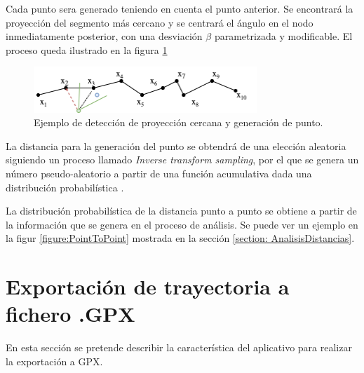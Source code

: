 Cada punto sera generado teniendo en cuenta el punto anterior. Se encontrará la proyección del segmento
más cercano y se centrará el ángulo en el nodo inmediatamente posterior, con una desviación $\beta$ 
parametrizada y modificable. El proceso queda ilustrado en la figura \ref{fig:PointGeneration02}

\begin{figure}[htb]
\begin{center}
\includegraphics[width=0.75\textwidth]{./Imagenes/PointGeneration02.png}
\caption{Ejemplo de detección de proyección cercana y generación de punto.}
\label{fig:PointGeneration02}
\end{center}
\end{figure}

La distancia para la generación del punto se obtendrá de una elección aleatoria siguiendo un proceso 
llamado \textit{Inverse transform sampling}, por el que se genera un número pseudo-aleatorio a partir 
de una función acumulativa dada una distribución probabilística \cite{Sigman01}.

La distribución probabilística de la distancia punto a punto se obtiene a partir de la información 
que se genera en el proceso de análisis. Se puede ver un ejemplo en la figur 
\ref{figure:PointToPoint} mostrada en la sección \ref{section: AnalisisDistancias}.

\section{Exportación de trayectoria a fichero .\ac{GPX}}
En esta sección se pretende describir la característica del aplicativo para realizar la exportación a GPX.
